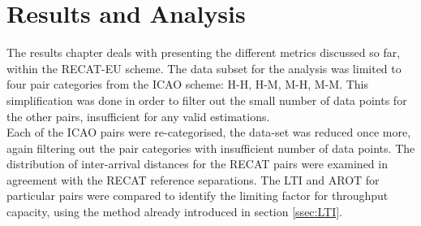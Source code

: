 \chapter{Results and Analysis\label{cha:results_analysis}}


The results chapter deals with presenting the different metrics discussed so far, within the RECAT-EU scheme. The data subset for the analysis was limited to four pair categories from the ICAO scheme: H-H, H-M, M-H, M-M. This simplification was done in order to filter out the small number of data points for the other pairs, insufficient for any valid estimations. \\
Each of the ICAO pairs were re-categorised, the data-set was reduced once more, again filtering out the pair categories with insufficient number of data points. 
The distribution of inter-arrival distances for the RECAT pairs were examined in agreement with the RECAT reference separations. The LTI and AROT for particular pairs were compared to identify the limiting factor for throughput capacity, using the method already introduced in section \ref{ssec:LTI}.
